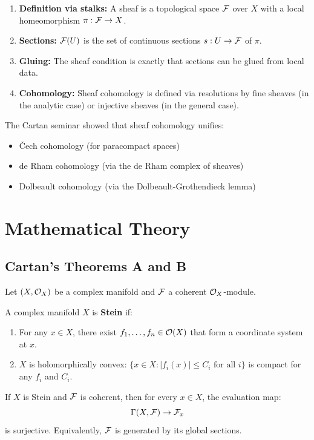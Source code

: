 \begin{enumerate}
    \item \textbf{Definition via stalks:} A sheaf is a topological space $\mathcal{F}$ over $X$ with a local homeomorphism $\pi: \mathcal{F} \to X$.
    \item \textbf{Sections:} $\mathcal{F}(U)$ is the set of continuous sections $s: U \to \mathcal{F}$ of $\pi$.
    \item \textbf{Gluing:} The sheaf condition is exactly that sections can be glued from local data.
    \item \textbf{Cohomology:} Sheaf cohomology is defined via resolutions by fine sheaves (in the analytic case) or injective sheaves (in the general case).
\end{enumerate}

The Cartan seminar showed that sheaf cohomology unifies:
\begin{itemize}
    \item \v{C}ech cohomology (for paracompact spaces)
    \item de Rham cohomology (via the de Rham complex of sheaves)
    \item Dolbeault cohomology (via the Dolbeault-Grothendieck lemma)
\end{itemize}

\section{Mathematical Theory}

\subsection{Cartan's Theorems A and B}

Let $(X, \mathcal{O}_X)$ be a complex manifold and $\mathcal{F}$ a coherent $\mathcal{O}_X$-module.

\begin{definition}
A complex manifold $X$ is \textbf{Stein} if:
\begin{enumerate}
    \item For any $x \in X$, there exist $f_1,\dots,f_n \in \mathcal{O}(X)$ that form a coordinate system at $x$.
    \item $X$ is holomorphically convex: $\{x \in X : |f_i(x)| \leq C_i \text{ for all } i\}$ is compact for any $f_i$ and $C_i$.
\end{enumerate}
\end{definition}

\begin{theorem}
If $X$ is Stein and $\mathcal{F}$ is coherent, then for every $x \in X$, the evaluation map:
\[
\Gamma(X, \mathcal{F}) \to \mathcal{F}_x
\]
is surjective. Equivalently, $\mathcal{F}$ is generated by its global sections.
\end{theorem}

